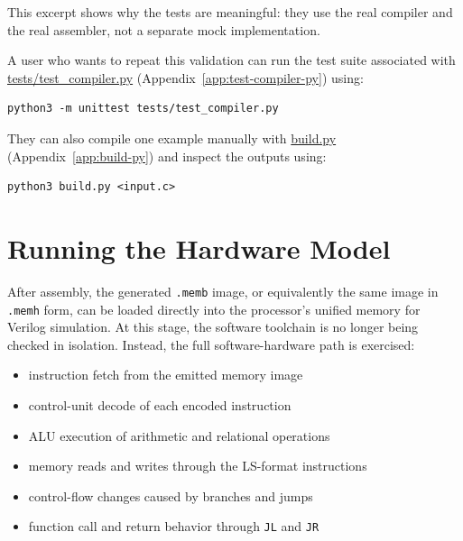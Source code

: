 \documentclass[12pt]{report}
\begin{document}
This excerpt shows why the tests are meaningful: they use the real compiler and
the real assembler, not a separate mock implementation.

A user who wants to repeat this validation can run the test suite associated
with
\href{https://github.com/shorewind/Custom-ISA-Toolchain/blob/main/tests/test_compiler.py}{tests/test\_compiler.py}
(Appendix~\ref{app:test-compiler-py}) using:

\begin{center}
\begin{minipage}{0.60\textwidth}
\begin{lstlisting}
python3 -m unittest tests/test_compiler.py
\end{lstlisting}
\end{minipage}
\end{center}

They can also compile one example manually with
\href{https://github.com/shorewind/Custom-ISA-Toolchain/blob/main/build.py}{build.py}
(Appendix~\ref{app:build-py}) and inspect the outputs using:

\begin{center}
\begin{minipage}{0.32\textwidth}
\begin{lstlisting}
python3 build.py <input.c>
\end{lstlisting}
\end{minipage}
\end{center}

\section{Running the Hardware Model}

After assembly, the generated \texttt{.memb} image, or equivalently the same
image in \texttt{.memh} form, can be loaded directly into the processor's
unified memory for Verilog simulation. At this stage, the software toolchain
is no longer being checked in isolation. Instead, the full software-hardware
path is exercised:

\begin{itemize}
    \item instruction fetch from the emitted memory image
    \item control-unit decode of each encoded instruction
    \item ALU execution of arithmetic and relational operations
    \item memory reads and writes through the LS-format instructions
    \item control-flow changes caused by branches and jumps
    \item function call and return behavior through \texttt{JL} and \texttt{JR}
\end{itemize}
\end{document}
